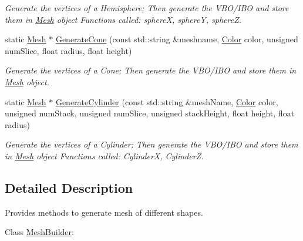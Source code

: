 \begin{DoxyCompactItemize}
\begin{DoxyCompactList}\small\item\em Generate the vertices of a Hemisphere; Then generate the V\+B\+O/\+I\+B\+O and store them in \hyperlink{class_mesh}{Mesh} object Functions called\+: sphere\+X, sphere\+Y, sphere\+Z. \end{DoxyCompactList}\item 
static \hyperlink{class_mesh}{Mesh} $\ast$ \hyperlink{class_mesh_builder_a5829e4aa60902b040684c1d153c8ddf2}{Generate\+Cone} (const std\+::string \&meshname, \hyperlink{struct_color}{Color} color, unsigned num\+Slice, float radius, float height)
\begin{DoxyCompactList}\small\item\em Generate the vertices of a Cone; Then generate the V\+B\+O/\+I\+B\+O and store them in \hyperlink{class_mesh}{Mesh} object. \end{DoxyCompactList}\item 
static \hyperlink{class_mesh}{Mesh} $\ast$ \hyperlink{class_mesh_builder_ae32277cc64f8e2e94497331568fe610b}{Generate\+Cylinder} (const std\+::string \&mesh\+Name, \hyperlink{struct_color}{Color} color, unsigned num\+Stack, unsigned num\+Slice, unsigned stack\+Height, float height, float radius)
\begin{DoxyCompactList}\small\item\em Generate the vertices of a Cylinder; Then generate the V\+B\+O/\+I\+B\+O and store them in \hyperlink{class_mesh}{Mesh} object Functions called\+: Cylinder\+X, Cylinder\+Z. \end{DoxyCompactList}\end{DoxyCompactItemize}


\subsection{Detailed Description}
Provides methods to generate mesh of different shapes. 

Class \hyperlink{class_mesh_builder}{Mesh\+Builder}\+: 

